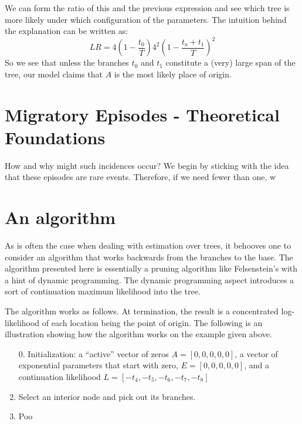 \documentclass[11pt]{article}
\begin{document}
 We can form the ratio of this and the previous expression and see which tree is more likely under which configuration of the parameters. The intuition behind the explanation can be written as:
 \begin{equation*}
 LR = 4\left({1-\frac{t_0}{T}}\right)4^2\left(1-\frac{t_o+t_1}{T}\right)^2
 \end{equation*}
So we see that unless the branches $t_0$ and $t_1$ constitute a (very) large span of the tree, our model claims that $A$ is the most likely place of origin.

\section{Migratory Episodes - Theoretical Foundations}

How and why might such incidences occur? We begin by sticking with the idea that these episodes are rare events. Therefore, if we need fewer than one, w

\section{An algorithm}

As is often the case when dealing with estimation over trees, it behooves one to consider an algorithm that works backwards from the branches to the base. The algorithm presented here is essentially a pruning algorithm like Felsenstein's with a hint of dynamic programming. The dynamic programming aspect introduces a sort of continuation maximum likelihood into the tree.

The algorithm works as follows. At termination, the result is a concentrated log-likelihood of each location being the point of origin.  The following is an illustration showing how the algorithm works on the example given above.

\begin{enumerate}
\item[0.] Initialization: a ``active'' vector of zeros $A=[0,0,0,0,0]$, a vector of exponential parameters that start with zero, $E=[0,0,0,0,0]$, and a continuation likelihood $L=[-t_4,-t_5,-t_6,-t_7,-t_8]$
\item  Select an interior node and pick out its branches.
\item  Poo
\end{enumerate}
\end{document}
